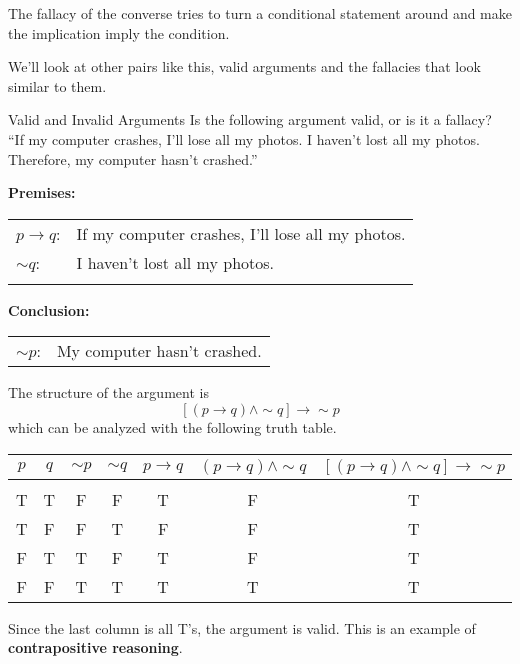 The fallacy of the converse tries to turn a conditional statement around and make the implication imply the condition.

We'll look at other pairs like this, valid arguments and the fallacies that look similar to them.
\vfill
\pagebreak

\begin{example}[https://www.youtube.com/watch?v=UTm75PK8uSs]{Valid and Invalid Arguments}
Is the following argument valid, or is it a fallacy?\\

``If my computer crashes, I'll lose all my photos.  I haven't lost all my photos.  Therefore, my computer hasn't crashed.''

\sol
\textbf{Premises:}\\
\begin{tabular}{l l}
$p \to q$: & If my computer crashes, I'll lose all my photos.\\
$\sim q$: & I haven't lost all my photos.\\
& \\
\end{tabular}

\textbf{Conclusion:}\\
\begin{tabular}{l l}
$\sim p$: & My computer hasn't crashed.
\end{tabular}

The structure of the argument is \[[(p \to q) \wedge \sim q] \to \sim p\]
which can be analyzed with the following truth table.
\begin{center}
\begin{tabular}{|c c c c c c c|}
\hline
$p$ & $q$ & $\sim p$ & $\sim q$ & $p \to q$ & $(p \to q) \wedge \sim q$ & $[(p \to q) \wedge \sim q] \to \sim p$\\
\hline
& & & & & & \\
T & T & F & F & T & F & T\\
T & F & F & T & F & F & T\\
F & T & T & F & T & F & T\\
F & F & T & T & T & T & T\\
\hline
\end{tabular}
\end{center}

Since the last column is all T's, the argument is valid.  This is an example of \textbf{contrapositive reasoning}.
\end{example}

